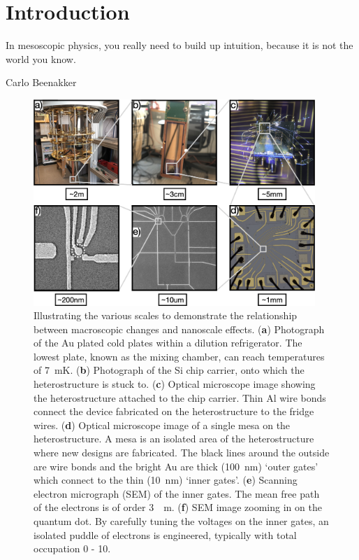 \chapter{Introduction}\label{cha:intro}
\epigraph{In mesoscopic physics, you really need to build up intuition, because it is not the world you know.}{Carlo Beenakker}


\begin{figure}[!htb]
 \begin{center}
 \includegraphics[width=0.95\textwidth]{figures/ch1/crop_FiguresMaster.001.png}
 \caption[Dilution fridge to quantum dot scale breakdown]{\label{fig:ch1/scale_breakdown} 
 Illustrating the various scales to demonstrate the relationship between macroscopic changes and nanoscale effects. (\textbf{a}) Photograph of the Au plated cold plates within a dilution refrigerator. The lowest plate, known as the mixing chamber, can reach temperatures of \qty{7}{mK}. (\textbf{b}) Photograph of the Si chip carrier, onto which the heterostructure is stuck to. (\textbf{c}) Optical microscope image showing the heterostructure attached to the chip carrier. Thin Al wire bonds connect the device fabricated on the heterostructure to the fridge wires. (\textbf{d}) Optical microscope image of a single mesa on the heterostructure. A mesa is an isolated area of the heterostructure where new designs are fabricated. The black lines around the outside are wire bonds and the bright Au are thick (\qty{100}{nm}) `outer gates' which connect to the thin (\qty{10}{nm}) `inner gates'. (\textbf{e}) Scanning electron micrograph (SEM) of the inner gates. The mean free path of the electrons is of order \qty{3}{\mu m}. (\textbf{f}) SEM image zooming in on the quantum dot. By carefully tuning the voltages on the inner gates, an isolated puddle of electrons is engineered, typically with total occupation 0 - 10. 
  }
 \end{center}
\end{figure}





